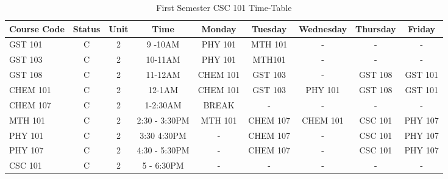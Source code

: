 \documentclass{article}
\begin{document}
	
	\begin{sidewaystable}[ht!]
		\begin{center}
			\caption{First Semester CSC 101 Time-Table}
			\label{tab:table1}
			
			\begin{tabular}{|l|c|c|c|c|c|c|c|c|}
				\cellcolor{blue!16} \textbf{Course Code} & \cellcolor{blue!16} \textbf{Status} & \cellcolor{blue!16} \textbf{Unit} &\cellcolor{blue!16} \textbf{Time} &\cellcolor{green!40} \textbf{Monday} &\cellcolor{green!40} \textbf{Tuesday} &\cellcolor{green!40} \textbf{Wednesday} &\cellcolor{green!40} \textbf{Thursday} &\cellcolor{green!40} \textbf{Friday}\\
				\hline
				\cellcolor{pink!50}GST 101  & C & 2 & 9 -10AM & PHY 101 & MTH 101 & - &  - & -\\
				\cellcolor{green!30}GST 103 & C & 2 & 10-11AM & PHY 101 & MTH101 & - &- &-\\
				\cellcolor{pink!50}GST 108 & C & 2 & 11-12AM & CHEM 101 & GST 103 & - & GST 108 & GST 101\\
				\cellcolor{green!30}CHEM 101 & C & 2 & 12-1AM & CHEM 101 & GST 103 & PHY 101 & GST 108 & GST 101\\
				\cellcolor{pink!50}CHEM 107 & C & 2 & 1-2:30AM &\cellcolor{black!40} BREAK & \cellcolor{black!40}- & \cellcolor{black!40}- & \cellcolor{black!40}- & \cellcolor{black!40}-\\
				\cellcolor{green!30} MTH 101 & C & 2 & 2:30 - 3:30PM & MTH 101 & CHEM 107 & CHEM 101 & CSC 101 & PHY 107\\
				\cellcolor{pink!50} PHY 101 & C & 2 & 3:30 4:30PM & - & CHEM 107 & - & CSC 101 & PHY 107\\
				\cellcolor{green!30} PHY 107 & C & 2 & 4:30 - 5:30PM & - & CHEM 107 & - & CSC 101 & PHY 107\\
				\cellcolor{pink!50} CSC 101 & C & 2 & 5 - 6:30PM & - & - & - & - & -\\
				\hline
				\end{tabular}
		\end{center}
	\end{sidewaystable}
\end{document}

